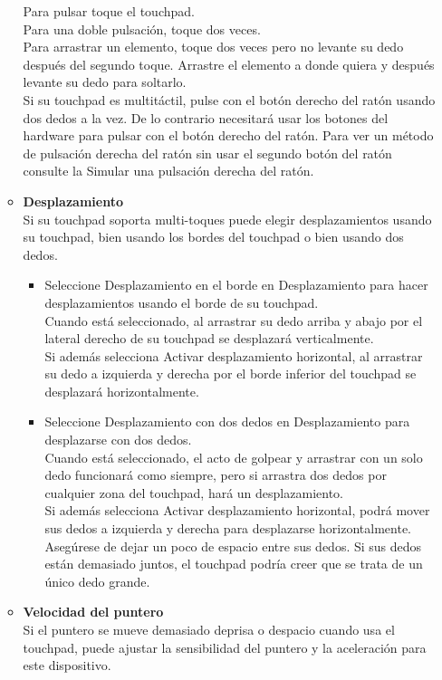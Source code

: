 \documentclass[12pt,letterpaper]{book}
\begin{document}
\begin{itemize}
\begin{itemize}
Para pulsar toque el touchpad.\\
Para una doble pulsación, toque dos veces.\\
Para arrastrar un elemento, toque dos veces pero no levante su dedo después del segundo toque. Arrastre el elemento a donde quiera y después levante su dedo para soltarlo.\\
Si su touchpad es multitáctil, pulse con el botón derecho del ratón usando dos dedos a la vez. De lo contrario necesitará usar los botones del hardware para pulsar con el botón derecho del ratón. Para ver un método de pulsación derecha del ratón sin usar el segundo botón del ratón consulte la Simular una pulsación derecha del ratón.
\item{\bf Desplazamiento}\\
Si su touchpad soporta multi-toques puede elegir desplazamientos usando su touchpad, bien usando los bordes del touchpad o bien usando dos dedos.\\
\begin{itemize}
\item Seleccione Desplazamiento en el borde en Desplazamiento para hacer desplazamientos usando el borde de su touchpad.\\ Cuando está seleccionado, al arrastrar su dedo arriba y abajo por el lateral derecho de su touchpad se desplazará verticalmente.\\ Si además selecciona Activar desplazamiento horizontal, al arrastrar su dedo a izquierda y derecha por el borde inferior del touchpad se desplazará horizontalmente.

\item Seleccione Desplazamiento con dos dedos en Desplazamiento para desplazarse con dos dedos.\\
Cuando está seleccionado, el acto de golpear y arrastrar con un solo dedo funcionará como siempre, pero si arrastra dos dedos por cualquier zona del touchpad, hará un desplazamiento.\\ Si además selecciona Activar desplazamiento horizontal, podrá mover sus dedos a izquierda y derecha para desplazarse horizontalmente. Asegúrese de dejar un poco de espacio entre sus dedos. Si sus dedos están demasiado juntos, el touchpad podría creer que se trata de un único dedo grande.
\end{itemize}
\item{\bf Velocidad del puntero}\\
Si el puntero se mueve demasiado deprisa o despacio cuando usa el touchpad, puede ajustar la sensibilidad del puntero y la aceleración para este dispositivo.\\


\end{itemize}
\end{itemize}
\end{document}

